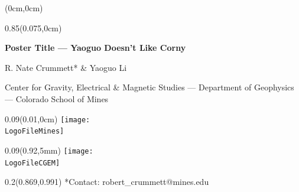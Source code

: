 \documentclass[dark]{cgem-poster}
\makeatletter
\newcommand{\PosterTitle}{Poster Title --- Yaoguo Doesn't Like Corny}
\newcommand{\PosterFirstAuthor}{R. Nate Crummett}
\newcommand{\PosterFirstAuthorContact}{robert\_crummett@mines.edu}
\newcommand{\PosterSecondAuthor}{Yaoguo Li}
\newcommand{\PosterAffiliationCGEM}{Center for Gravity, Electrical \& Magnetic Studies}
\newcommand{\PosterAffiliationMines}{Colorado School of Mines}
\newcommand{\PosterAffiliationGeophysics}{Department of Geophysics}
\makeatother
\begin{document}

  \newcommand{\titleheight}{0.09\pageheight}
  \newcommand{\PosterCGEMLogoHeight}{\dimexpr(\titleheight - 12mm)\relax}
  
  \begin{textblock*}{\pagewidth}(0cm,0cm)
    \begin{minipage}[t][\titleheight{}][t]{\pagewidth}
    \end{minipage}
  \end{textblock*}
  
  \begin{textblock*}{0.85\pagewidth}(0.075\pagewidth,0cm)
    \begin{center}
      \vspace{5mm}
      \Large
      \textbf{
        \PosterTitle{}
      }
      \par
      \vspace{5mm}
      \normalsize
      { \color{PosterSubtitleColor}
        \PosterFirstAuthor{}* \& \PosterSecondAuthor{}
        \par
        \small
        \PosterAffiliationCGEM{} --- %
          \PosterAffiliationGeophysics{} --- %
          \PosterAffiliationMines{}
      }
    \end{center}
  \end{textblock*}
  
  \begin{textblock*}{\titleheight{}}(0.01\pagewidth,0cm)
    \centering
    \hspace*{-20.72449pt}
    \texttt{[image: \\LogoFileMines]}
  \end{textblock*}
  
  \begin{textblock*}{\titleheight{}}(0.92\pagewidth,5mm)
    \centering
    \texttt{[image: \\LogoFileCGEM]}
  \end{textblock*}

  \begin{textblock*}{0.2\pagewidth}(0.869\pagewidth,0.991\pageheight)
    \tiny
    { \color{PosterSubtitleColor}
      *Contact: %
      \PosterFirstAuthorContact{}
    }
  \end{textblock*}
  
\end{document}
